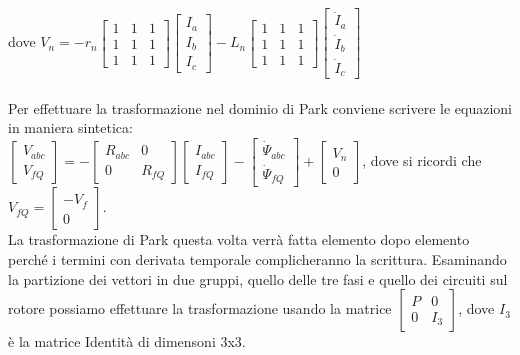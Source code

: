 \documentclass[Lau,noexaminfo]{sapthesis}
\begin{document}
	dove $V_n=-r_n
	\begin{bmatrix}
	 1 & 1 & 1\\
	 1 & 1 & 1\\
	 1 & 1 & 1
	\end{bmatrix}
	\begin{bmatrix}
	I_a\\
	I_b\\
	I_c
	\end{bmatrix}-
	L_n
	\begin{bmatrix}
	1 & 1 & 1\\
	1 & 1 & 1\\
	1 & 1 & 1
	\end{bmatrix}
	\begin{bmatrix}
	\dot{I}_a\\
	\dot{I}_b\\
	\dot{I}_c
	\end{bmatrix}$\\\\
	Per effettuare la trasformazione nel dominio di Park conviene scrivere le equazioni in maniera sintetica:\\
	$\begin{bmatrix}
		V_{abc}\\
		V_{fQ}
	\end{bmatrix}=-
	\begin{bmatrix}
		R_{abc} & 0\\
		0 & R_{fQ}
	\end{bmatrix}
	\begin{bmatrix}
	I_{abc}\\
	I_{fQ}
	\end{bmatrix}-
	\begin{bmatrix}
	\dot{\Psi}_{abc}\\
	\dot{\Psi}_{fQ}
	\end{bmatrix}+
	\begin{bmatrix}
	V_{n}\\
	0
	\end{bmatrix}$, dove si ricordi che\\
	$V_{fQ}=\begin{bmatrix}
	-V_{f}\\
	0
	\end{bmatrix}$.\\ La trasformazione di Park questa volta verrà fatta elemento dopo elemento perché i termini con derivata temporale complicheranno la scrittura. Esaminando la partizione dei vettori in due gruppi, quello delle tre fasi e quello dei circuiti sul rotore possiamo effettuare la trasformazione usando la matrice $\begin{bmatrix}
	P & 0\\
	0 & I_3
	\end{bmatrix}$, dove $I_3$ è la matrice Identità di dimensoni 3x3.\\\\
\end{document}
